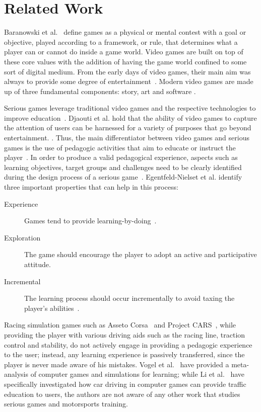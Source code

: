 \documentclass{sig-alternate}
\begin{document}
{\section{Related Work}
\label{sec:related-work}
Baranowski et al.~\cite{yuserious} define games as a physical or mental contest with a goal or objective, played according to a framework, or rule, that determines what a player can or cannot do inside a game world. Video games are built on top of these core values with the addition of having the game world confined to some sort of digital medium. From the early days of video games, their main aim was always to provide some degree of entertainment~\cite{stanton2015brief}. Modern video games are made up of three fundamental components: story, art and software \cite{zyda2005visual}.

Serious games leverage traditional video games and the respective technologies to improve education~\cite{abt1970, stanton2015brief}. Djaouti et al. hold that the ability of video games to capture the attention of users can be harnessed for a variety of purposes that go beyond entertainment. \cite{djaouti2011classifying}. Thus, the main differentiator between video games and serious games is the use of pedagogic activities that aim to educate or instruct the player~\cite{zyda2005visual, Harteveld2007}. In order to produce a valid pedagogical experience, aspects such as learning objectives, target groups and challenges need to be clearly identified during the design process of a serious game~\cite{moser2002methodology}. Egentfeld-Nielset et al. identify three important properties that can help in this process:
\begin{description}
\item[Experience] Games tend to provide learning-by-doing~\cite{egenfeldt2005beyond}.

\item[Exploration] The game should encourage the player to adopt an active and participative attitude. 

\item[Incremental] The learning process should occur incrementally to avoid taxing the player's abilities~\cite{moser2002methodology}.
\end{description}

Racing simulation games such as Asseto Corsa~\cite{assestoCorsa} and Project CARS~\cite{ProjectCars}, while providing the player with various driving aids such as the racing line, traction control and stability, do not actively engage in providing a pedagogic experience to the user; instead, any learning experience is passively transferred, since the player is never made aware of his mistakes. Vogel et al.~\cite{vogel2006computer} have provided a meta-analysis of computer games and simulations for learning; while Li et al.~\cite{li2015can} have specifically investigated how car driving in computer games can provide traffic education to users, the authors are not aware of any other work that studies serious games and motorsports training.

}
\end{document}
